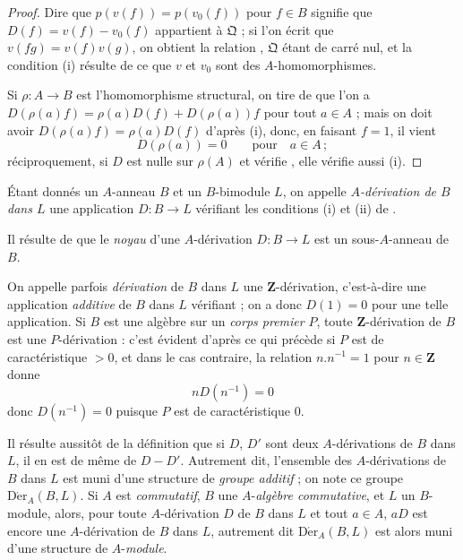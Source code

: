\begin{proof}
Dire que $p(v(f))=p(v_0(f))$ pour $f\in B$ signifie que
$D(f)=v(f)-v_0(f)$ appartient à $\mathfrak{Q}$ ; si l'on écrit que
$v(fg)=v(f)v(g)$, on obtient la relation ,
$\mathfrak{Q}$ étant de carré nul, et la condition (i) résulte de ce que $v$
et $v_0$ sont des $A$-homomorphismes.

Si $\rho:A\to B$ est l'homomorphisme structural, on tire de
 que l'on a
$D(\rho(a)f)=\rho(a)D(f)+D(\rho(a))f$ pour tout $a\in A$ ; mais on doit
avoir $D(\rho(a)f)=\rho(a)D(f)$ d'après (i), donc, en faisant $f=1$, il
vient
\[
  D(\rho(a))=0 \qquad\text{pour}\quad a\in A\,;
\]
réciproquement, si $D$ est nulle sur $\rho(A)$ et vérifie
, elle vérifie aussi (i).
\end{proof}

\begin{definition}[20.1.2]
\label{0.20.1.2-fr}
Étant donnés un $A$-anneau $B$ et un $B$-bimodule $L$, on appelle
\emph{$A$-dérivation de $B$ dans $L$} une application $D:B\to L$ vérifiant
les conditions (i) et (ii) de .
\end{definition}

Il résulte de  que le \emph{noyau} d'une $A$-dérivation
$D:B\to L$ est un sous-$A$-anneau de $B$.

On appelle parfois \emph{dérivation} de $B$ dans $L$ une
$\mathbf{Z}$-dérivation, c'est-à-dire une application \emph{additive} de $B$
dans $L$ vérifiant  ; on a donc $D(1)=0$ pour une telle
application. Si $B$ est une algèbre sur un \emph{corps premier} $P$, toute
$\mathbf{Z}$-dérivation de $B$ est une $P$-dérivation : c'est évident d'après
ce qui précède si $P$ est de caractéristique $>0$, et dans le cas contraire,
la relation $n.n^{-1}=1$ pour $n\in\mathbf{Z}$ donne
\[
  nD(n^{-1})=0
\]
donc $D(n^{-1})=0$ puisque $P$ est de caractéristique $0$.

Il résulte aussitôt de la définition  que si $D$, $D'$ sont
deux $A$-dérivations de $B$ dans $L$, il en est de même de $D-D'$. Autrement
dit, l'ensemble des $A$-dérivations de $B$ dans $L$ est muni d'une structure
de \emph{groupe additif} ; on note ce groupe
$\operatorname{D\acute{e}r}_A(B,L)$. Si $A$ est \emph{commutatif}, $B$ une
$A$-\emph{algèbre commutative}, et $L$ un $B$-module, alors, pour toute
$A$-dérivation $D$ de $B$ dans $L$ et tout $a\in A$, $aD$ est encore une
$A$-dérivation de $B$ dans $L$, autrement dit $\operatorname{D\acute{e}r}_A(B,L)$
est alors muni d'une structure de $A$-\emph{module}.

